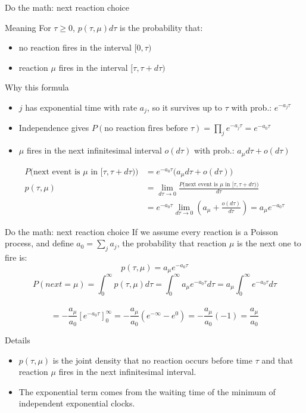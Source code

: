 \documentclass[presentation]{beamer}
\begin{document}
\begin{frame}{Do the math: next reaction choice}
\small
\begin{block}{Meaning}
For $\tau \geq 0$, $p(\tau,\mu)d\tau$ is the probability that:
\begin{itemize}
 \item no reaction fires in the interval $[0,\tau)$
 \item reaction $\mu$ fires in the interval $[\tau,\tau + d\tau)$
\end{itemize}
\end{block}
\begin{block}{Why this formula}
 \begin{itemize}
 \item $j$ has exponential time with rate $a_j$, so it survives up to $\tau$ with prob.: $e^{-a_j\tau}$
 \item Independence gives $P(\text{no reaction fires before }\tau) = \prod_j e^{-a_j\tau} = e^{-a_0\tau}$
 \item $\mu$ fires in the next infinitesimal interval $o(d\tau)$ with prob.: $a_\mu d\tau + o(d\tau)$
\end{itemize}
$$
\begin{aligned}
P\bigl(\text{next event is }\mu\text{ in }[\tau,\tau+d\tau)\bigr)
&= e^{-a_0\tau}\bigl(a_\mu d\tau + o(d\tau)\bigr) \\
p(\tau,\mu)
&= \lim_{d\tau \to 0}
\frac{P\bigl(\text{next event is }\mu\text{ in }[\tau,\tau+d\tau)\bigr)}{d\tau} \\
&= e^{-a_0\tau}\lim_{d\tau \to 0}\left(a_\mu + \frac{o(d\tau)}{d\tau}\right)
= a_\mu e^{-a_0\tau}
\end{aligned}
$$
\end{block}
\end{frame}

\begin{frame}{Do the math: next reaction choice}
If we assume every reaction is a Poisson process, and define $a_0 = \sum_j a_j$, the probability that reaction $\mu$ is the next one to fire is: \\
$$
p(\tau,\mu)
= a_\mu e^{-a_0\tau}
$$
$$
P(next = \mu)
= \int_0^\infty p(\tau,\mu)d\tau
= \int_0^\infty a_\mu e^{-a_0\tau}d\tau
= a_\mu \int_0^\infty  e^{-a_0\tau}d\tau
$$ \\
$$
= -\frac{a_\mu}{a_0} [e^{-a_0\tau}]_0^\infty
= -\frac{a_\mu}{a_0} (e^{-\infty} - e^{0})
= -\frac{a_\mu}{a_0} (-1)
= \frac{a_\mu}{a_0}$$
\begin{block}{Details}
 \begin{itemize}
  \item $p(\tau,\mu)$ is the joint density that no reaction occurs before time $\tau$ and that reaction $\mu$ fires in the next infinitesimal interval.
  \item The exponential term comes from the waiting time of the minimum of independent exponential clocks.
 \end{itemize}
\end{block}
\end{frame}
\end{document}
